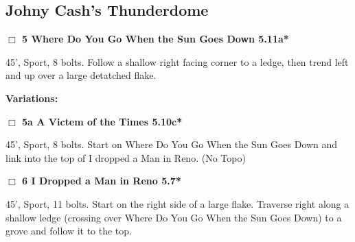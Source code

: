 	\begin{multicols}{2}

\needspace{10em}
\subsection*{Johny Cash's Thunderdome}\label{bf:Johny Cash's Thunderdome}




\needspace{2em}
\label{rt:Where Do You Go When the Sun Goes Down}
\colorbox{RoyalBlue!20}{
\parbox{0.95\linewidth}{
\hspace{-1ex}\textbf{$\Box$
5 Where Do You Go When the Sun Goes Down 5.11a*  
}}}
\begin{adjustwidth}{1.3em}{}			

45', Sport, 8 bolts. Follow a shallow right facing corner to a ledge, then trend left and up over a large detatched flake.
\end{adjustwidth}


\begin{adjustwidth}{0.5cm}{}				
\needspace{4em}
\textbf{Variations:} \newline

\needspace{2em}
\label{vr:A Victem of the Times}
\colorbox{RoyalBlue!20}{
\parbox{0.95\linewidth}{
\hspace{-1ex}\textbf{$\Box$
5a A Victem of the Times 5.10c*  
}}}
\begin{adjustwidth}{1.3em}{}			

45', Sport, 8 bolts. Start on Where Do You Go When the Sun Goes Down and link into the top of I dropped a Man in Reno.
  (No Topo)
\end{adjustwidth}



\end{adjustwidth}


\needspace{2em}
\label{rt:I Dropped a Man in Reno}
\colorbox{green!20}{
\parbox{0.95\linewidth}{
\hspace{-1ex}\textbf{$\Box$
6 I Dropped a Man in Reno 5.7*  
}}}
\begin{adjustwidth}{1.3em}{}			

45', Sport, 11 bolts. Start on the right side of a large flake. Traverse right along a shallow ledge (crossing over Where Do You Go When the Sun Goes Down) to a grove and follow it to the top.
\end{adjustwidth}





\end{multicols}
